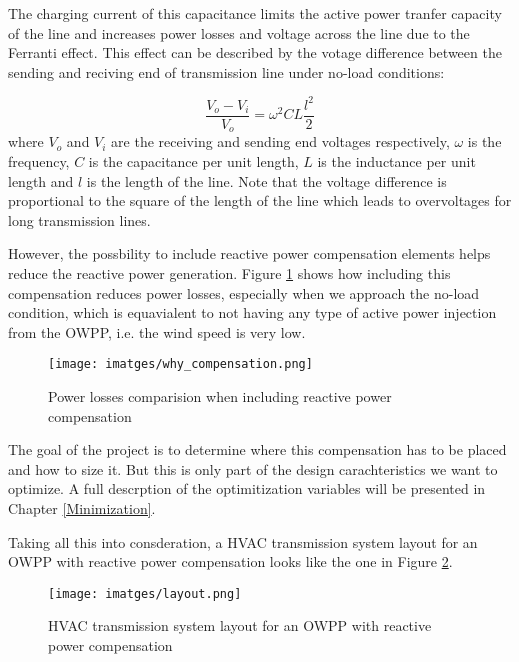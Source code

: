\documentclass[a4paper,11pt, titlepage, twoside]{article}
\begin{document}
The charging current of this capacitance limits the active power tranfer capacity of the line and increases
power losses and voltage across the line due to the Ferranti effect\cite{ferranti}. This effect can be described by the votage difference between the sending and reciving end of transmission line under no-load conditions:

\begin{equation}
    \frac{V_{o} - V_{i}}{V_{o}} = \omega^2CL\frac{l^2}{2}
\end{equation}
where $V_{o}$ and $V_{i}$ are the receiving and sending end voltages respectively, $\omega$ is the frequency, $C$ is the capacitance per unit length, $L$ is the inductance per unit length and $l$ is the length of the line. Note that the voltage difference is
proportional to the square of the length of the line which leads to overvoltages for long transmission lines.\par

However, the possbility to include reactive power compensation elements helps reduce the reactive power generation. Figure \ref{fig:whycomp} shows how including
this compensation reduces power losses, especially when we approach the no-load condition, which is equavialent to not having any type of active power injection from
the OWPP, i.e. the wind speed is very low.
\begin{figure}[h] %
	\centering
	\texttt{[image: imatges/why\_compensation.png]}
	\caption{Power losses comparision when including reactive power compensation}
	\label{fig:whycomp} %
\end{figure}

The goal of the project is to determine where this compensation has to be placed  and how to size it. But this is only part of the design carachteristics we want to optimize. A full descrption of the optimitization variables will be
presented in Chapter \ref{Minimization}.

Taking all this into consderation, a HVAC transmission system layout for an OWPP with reactive power compensation looks like the one in Figure \ref{fig:fulltransmission}.
\begin{figure}[H] %
    \centering
    \texttt{[image: imatges/layout.png]}
    \caption{HVAC transmission system layout for an OWPP with reactive power compensation\cite{paperbase}}
    \label{fig:fulltransmission} %
\end{figure}
\end{document}
